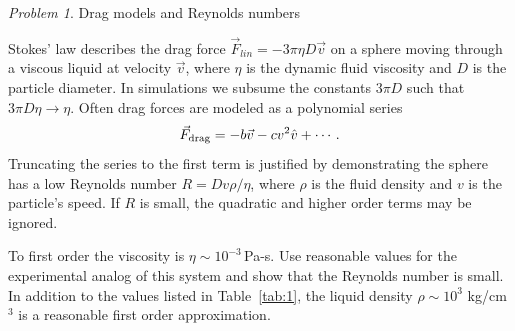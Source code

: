 \documentclass[preprint,showpacs,preprintnumbers,amsmath,amssymb,aps,prb]{revtex4-1}
\theoremstyle{remark}
\newtheorem{problem}{Problem}
\begin{document}
  \begin{problem}{Drag models and Reynolds numbers}
\label{ex:reynolds}

\noindent Stokes' law describes the drag force
  $\vec{F}_{lin} = -3 \pi \eta D \vec{v}$ 
  on a sphere
  moving through a viscous liquid at velocity $\vec{v}$,
  where $\eta$ is the dynamic fluid viscosity and 
  $D$ is the particle diameter.\cite{Taylor2005}
  In simulations we
  subsume the constants $3 \pi D$
  such that $3 \pi D \eta \rightarrow \eta $.
  Often drag forces are
  modeled as a polynomial series\cite{Taylor2005}
  \begin{equation}
    \vec{F}_{\rm drag} = -b \vec{v} - c v^2 \hat{v} + \cdots  .
  \end{equation}
  Truncating the series to the first term
  is justified by demonstrating the sphere
  has a low Reynolds number  
  $R = D v \rho / \eta$,
  where $\rho$ is the fluid density and $v$ is the particle's speed.
  If $R$ is small, the quadratic and higher order terms
  may be ignored.

To first order the viscosity is $\eta \sim 10^{-3}$\,Pa-s.\cite{Volpe2013}
Use reasonable values for the
  experimental analog of this system and show 
that the Reynolds number is small.
  In addition to the values listed in Table~\ref{tab:1}, 
  the liquid density 
  $\rho \sim 10^3$ kg/cm$^3$ is a reasonable
  first order approximation.\cite{asce}
  \end{problem}


  
\end{document}
